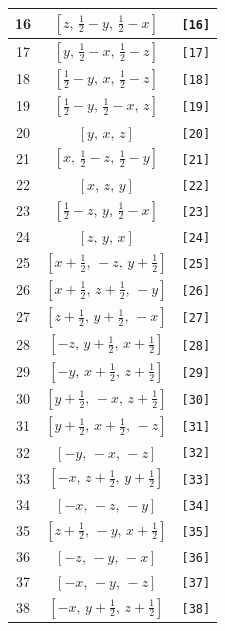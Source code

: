 \documentclass[fleqn,8pt]{jsarticle}
\begin{document}
\begin{longtable}{ccc}
16 & $\left[ z,\, \frac{1}{2} - y,\, \frac{1}{2} - x \right]$ & {\tt [16]} \\ \hline
17 & $\left[ y,\, \frac{1}{2} - x,\, \frac{1}{2} - z \right]$ & {\tt [17]} \\ \hline
18 & $\left[ \frac{1}{2} - y,\, x,\, \frac{1}{2} - z \right]$ & {\tt [18]} \\ \hline
19 & $\left[ \frac{1}{2} - y,\, \frac{1}{2} - x,\, z \right]$ & {\tt [19]} \\ \hline
20 & $\left[ y,\, x,\, z \right]$ & {\tt [20]} \\ \hline
21 & $\left[ x,\, \frac{1}{2} - z,\, \frac{1}{2} - y \right]$ & {\tt [21]} \\ \hline
22 & $\left[ x,\, z,\, y \right]$ & {\tt [22]} \\ \hline
23 & $\left[ \frac{1}{2} - z,\, y,\, \frac{1}{2} - x \right]$ & {\tt [23]} \\ \hline
24 & $\left[ z,\, y,\, x \right]$ & {\tt [24]} \\ \hline
25 & $\left[ x + \frac{1}{2},\, - z,\, y + \frac{1}{2} \right]$ & {\tt [25]} \\ \hline
26 & $\left[ x + \frac{1}{2},\, z + \frac{1}{2},\, - y \right]$ & {\tt [26]} \\ \hline
27 & $\left[ z + \frac{1}{2},\, y + \frac{1}{2},\, - x \right]$ & {\tt [27]} \\ \hline
28 & $\left[ - z,\, y + \frac{1}{2},\, x + \frac{1}{2} \right]$ & {\tt [28]} \\ \hline
29 & $\left[ - y,\, x + \frac{1}{2},\, z + \frac{1}{2} \right]$ & {\tt [29]} \\ \hline
30 & $\left[ y + \frac{1}{2},\, - x,\, z + \frac{1}{2} \right]$ & {\tt [30]} \\ \hline
31 & $\left[ y + \frac{1}{2},\, x + \frac{1}{2},\, - z \right]$ & {\tt [31]} \\ \hline
32 & $\left[ - y,\, - x,\, - z \right]$ & {\tt [32]} \\ \hline
33 & $\left[ - x,\, z + \frac{1}{2},\, y + \frac{1}{2} \right]$ & {\tt [33]} \\ \hline
34 & $\left[ - x,\, - z,\, - y \right]$ & {\tt [34]} \\ \hline
35 & $\left[ z + \frac{1}{2},\, - y,\, x + \frac{1}{2} \right]$ & {\tt [35]} \\ \hline
36 & $\left[ - z,\, - y,\, - x \right]$ & {\tt [36]} \\ \hline
37 & $\left[ - x,\, - y,\, - z \right]$ & {\tt [37]} \\ \hline
38 & $\left[ - x,\, y + \frac{1}{2},\, z + \frac{1}{2} \right]$ & {\tt [38]} \\ \hline

\end{longtable}
\end{document}
